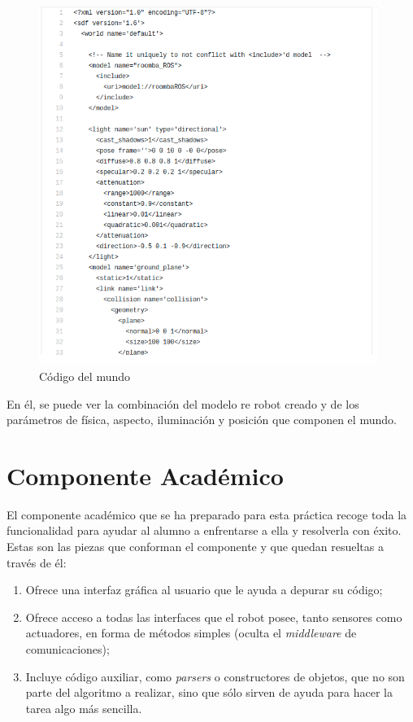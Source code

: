 \begin{figure}[H]
  \begin{center}
    \includegraphics[width=0.98\textwidth]{figures/codeworld.png}
		\caption{Código del mundo}
		\label{fig.codeworld}
		\end{center}
\end{figure}

En él, se puede ver la combinación del modelo re robot creado y de los parámetros de física, aspecto, iluminación y posición que componen el mundo.

\section{Componente Académico}
El componente académico que se ha preparado para esta práctica recoge toda la funcionalidad para ayudar al alumno a enfrentarse a ella y resolverla con éxito. Estas son las piezas que conforman el componente y que quedan resueltas a través de él:  

\begin{enumerate}[label=\alph*)]
	\item Ofrece una interfaz gráfica al usuario que le ayuda a depurar su código; 
	\item Ofrece acceso a todas las interfaces que el robot posee, tanto sensores como actuadores, en forma de métodos simples (oculta el \textit{middleware} de comunicaciones); 
	\item Incluye código auxiliar, como \textit{parsers} o constructores de objetos, que no son parte del algoritmo a realizar, sino que sólo sirven de ayuda para hacer la tarea algo más sencilla.
\end{enumerate}

